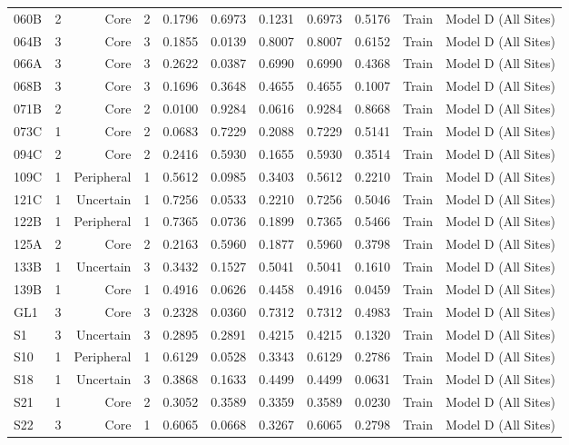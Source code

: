{\begin{longtable}{lrrrrrrrrrr}
  060B & 2 & Core & 2 & 0.1796 & 0.6973 & 0.1231 & 0.6973 & 0.5176 & Train & Model D (All Sites) \\
  064B & 3 & Core & 3 & 0.1855 & 0.0139 & 0.8007 & 0.8007 & 0.6152 & Train & Model D (All Sites) \\
  066A & 3 & Core & 3 & 0.2622 & 0.0387 & 0.6990 & 0.6990 & 0.4368 & Train & Model D (All Sites) \\
  068B & 3 & Core & 3 & 0.1696 & 0.3648 & 0.4655 & 0.4655 & 0.1007 & Train & Model D (All Sites) \\
  071B & 2 & Core & 2 & 0.0100 & 0.9284 & 0.0616 & 0.9284 & 0.8668 & Train & Model D (All Sites) \\
  073C & 1 & Core & 2 & 0.0683 & 0.7229 & 0.2088 & 0.7229 & 0.5141 & Train & Model D (All Sites) \\
  094C & 2 & Core & 2 & 0.2416 & 0.5930 & 0.1655 & 0.5930 & 0.3514 & Train & Model D (All Sites) \\
  109C & 1 & Peripheral & 1 & 0.5612 & 0.0985 & 0.3403 & 0.5612 & 0.2210 & Train & Model D (All Sites) \\
  121C & 1 & Uncertain & 1 & 0.7256 & 0.0533 & 0.2210 & 0.7256 & 0.5046 & Train & Model D (All Sites) \\
  122B & 1 & Peripheral & 1 & 0.7365 & 0.0736 & 0.1899 & 0.7365 & 0.5466 & Train & Model D (All Sites) \\
  125A & 2 & Core & 2 & 0.2163 & 0.5960 & 0.1877 & 0.5960 & 0.3798 & Train & Model D (All Sites) \\
  133B & 1 & Uncertain & 3 & 0.3432 & 0.1527 & 0.5041 & 0.5041 & 0.1610 & Train & Model D (All Sites) \\
  139B & 1 & Core & 1 & 0.4916 & 0.0626 & 0.4458 & 0.4916 & 0.0459 & Train & Model D (All Sites) \\
  GL1 & 3 & Core & 3 & 0.2328 & 0.0360 & 0.7312 & 0.7312 & 0.4983 & Train & Model D (All Sites) \\
  S1 & 3 & Uncertain & 3 & 0.2895 & 0.2891 & 0.4215 & 0.4215 & 0.1320 & Train & Model D (All Sites) \\
  S10 & 1 & Peripheral & 1 & 0.6129 & 0.0528 & 0.3343 & 0.6129 & 0.2786 & Train & Model D (All Sites) \\
  S18 & 1 & Uncertain & 3 & 0.3868 & 0.1633 & 0.4499 & 0.4499 & 0.0631 & Train & Model D (All Sites) \\
  S21 & 1 & Core & 2 & 0.3052 & 0.3589 & 0.3359 & 0.3589 & 0.0230 & Train & Model D (All Sites) \\
  S22 & 3 & Core & 1 & 0.6065 & 0.0668 & 0.3267 & 0.6065 & 0.2798 & Train & Model D (All Sites) \\

\end{longtable}}
